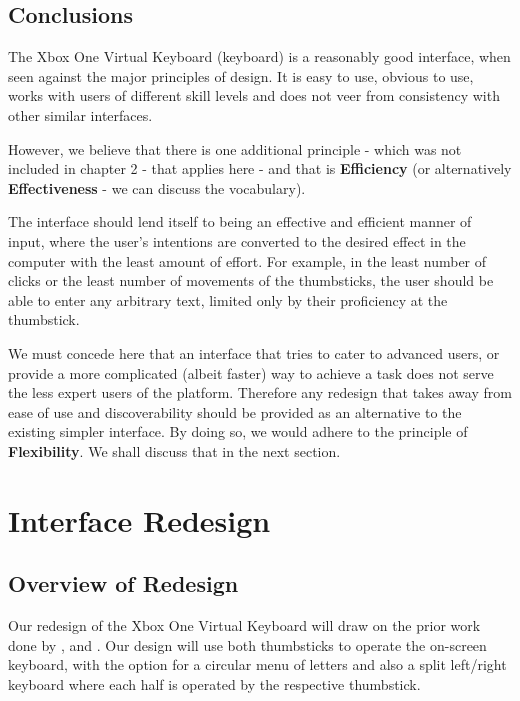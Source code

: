 \documentclass[
	letterpaper, %
]{jdf}
\begin{document}
\subsection{Conclusions}
The Xbox One Virtual Keyboard (keyboard) is a reasonably good interface, when seen against the major principles of design. It is easy to use, obvious to use, works with users of different skill levels and does not veer from consistency with other similar interfaces.

However, we believe that there is one additional principle - which was not included in chapter 2 - that applies here - and that is \textbf{Efficiency} (or alternatively \textbf{Effectiveness} - we can discuss the vocabulary).

The interface should lend itself to being an effective and efficient manner of input, where the user's intentions are converted to the desired effect in the computer with the least amount of effort. For example, in the least number of clicks or the least number of movements of the thumbsticks, the user should be able to enter any arbitrary text, limited only by their proficiency at the thumbstick.

We must concede here that an interface that tries to cater to advanced users, or provide a more complicated (albeit faster) way to achieve a task does not serve the less expert users of the platform. Therefore any redesign that takes away from ease of use and discoverability should be provided as an alternative to the existing simpler interface. By doing so, we would adhere to the principle of \textbf{Flexibility}. We shall discuss that in the next section.


\section{Interface Redesign}
\subsection{Overview of Redesign}
Our redesign of the Xbox One Virtual Keyboard will draw on the prior work done by \cite{eatsy_taplin_chechik_nelson_2002}, \cite{twostick_2007} and \cite{wilson_agrawala_2006}. Our design will use both thumbsticks to operate the on-screen keyboard, with the option for a circular menu of letters and also a split left/right keyboard where each half is operated by the respective thumbstick.
\end{document}
